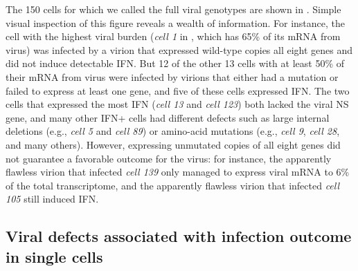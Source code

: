 \documentclass[9pt,lineno]{elife}
\begin{document}
The 150 cells for which we called the full viral genotypes are shown in .
Simple visual inspection of this figure reveals a wealth of information.
For instance, the cell with the highest viral burden (\textit{cell 1} in , which has 65\% of its mRNA from virus) was infected by a virion that expressed wild-type copies all eight genes and did not induce detectable IFN.
But 12 of the other 13 cells with at least 50\% of their mRNA from virus were infected by virions that either had a mutation or failed to express at least one gene, and five of these cells expressed IFN.
The two cells that expressed the most IFN (\textit{cell 13} and \textit{cell 123}) both lacked the viral NS gene, and many other IFN+ cells had different defects such as large internal deletions (e.g., \textit{cell 5} and \textit{cell 89}) or amino-acid mutations (e.g., \textit{cell 9}, \textit{cell 28}, and many others).
However, expressing unmutated copies of all eight genes did not guarantee a favorable outcome for the virus: for instance, the apparently flawless virion that infected \textit{cell 139} only managed to express viral mRNA to 6\% of the total transcriptome, and the apparently flawless virion that infected \textit{cell 105} still induced IFN.

\subsection{Viral defects associated with infection outcome in single cells}
\end{document}
